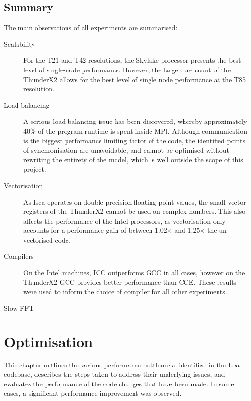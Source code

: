 \documentclass[a4paper,11pt]{report}
\begin{document}
\section{Summary}
The main observations of all experiments are summarised:
\begin{description}

	\item[Scalability] For the T21 and T42 resolutions, the Skylake processor presents the best level of single-node performance. However, the large core count of the ThunderX2 allows for the best level of single node performance at the T85 resolution. 

	\item[Load balancing] A serious load balancing issue has been discovered, whereby approximately 40\% of the program runtime is spent inside MPI. Although communication is the biggest performance limiting factor of the code, the identified points of synchronisation are unavoidable, and cannot be optimised without rewriting the entirety of the model, which is well outside the scope of this project.
	
	\item[Vectorisation] As Isca operates on double precision floating point values, the small vector registers of the ThunderX2 cannot be used on complex numbers. This also affects the performance of the Intel processors, as vectorisation only accounts for a performance gain of between 1.02$\times$ and 1.25$\times$ the un-vectorised code. 
	
	\item[Compilers] On the Intel machines, ICC outperforms GCC in all cases, however on the ThunderX2 GCC provides better performance than CCE. These results were used to inform the choice of compiler for all other experiments. 
	
	\item[Slow FFT] 
	
\end{description}






\let\textcircled=\pgftextcircled
\chapter[Optimisation]{Optimisation}
\label{chap:optimiations}
This chapter outlines the various performance bottlenecks identified in the Isca codebase, describes the steps taken to address their underlying issues, and evaluates the performance of the code changes that have been made. In some cases, a significant performance improvement was observed. 
\end{document}
